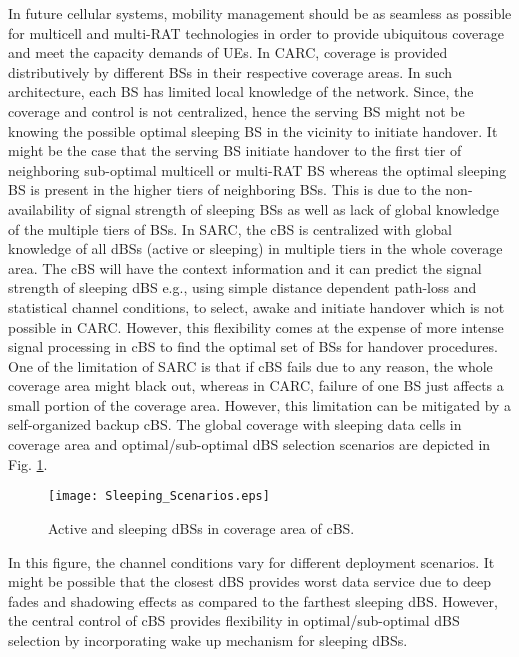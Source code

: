 \documentclass[article,10pt,twocolumn]{IEEEtran}
\begin{document}
In future cellular systems, mobility management should be as seamless as possible for multicell and multi-RAT technologies in order to provide ubiquitous coverage and meet the capacity demands of UEs. In CARC, coverage is provided distributively by different BSs in their respective coverage areas. In such architecture, each BS has limited local knowledge of the network. Since, the coverage and control is not centralized, hence the serving BS might not be knowing the possible optimal sleeping BS in the vicinity to initiate handover. It might be the case that the serving BS initiate handover to the first tier of neighboring sub-optimal multicell or multi-RAT BS whereas the optimal sleeping BS is present in the higher tiers of neighboring BSs. This is due to the non-availability of signal strength of sleeping BSs as well as lack of global knowledge of the multiple tiers of BSs. In SARC, the cBS is centralized with global knowledge of all dBSs (active or sleeping) in multiple tiers in the whole coverage area. The cBS will have the context information and it can predict the signal strength of sleeping dBS e.g., using simple distance dependent path-loss and statistical channel conditions, to select, awake and initiate handover which is not possible in CARC. However, this flexibility comes at the expense of more intense signal processing in cBS to find the optimal set of BSs for handover procedures. One of the limitation of SARC is that if cBS fails due to any reason, the whole coverage area might black out, whereas in CARC, failure of one BS just affects a small portion of the coverage area. However, this limitation can be mitigated by a self-organized backup cBS. The global coverage with sleeping data cells in coverage area and optimal/sub-optimal dBS selection scenarios are depicted in Fig. \ref{Figure:ss}.
\begin{figure}[!htb]
\centering
  \texttt{[image: Sleeping\_Scenarios.eps]}
  \caption{Active and sleeping dBSs in coverage area of cBS.}\label{Figure:ss}
\end{figure}

In this figure, the channel conditions vary for different deployment scenarios. It might be possible that the closest dBS provides worst data service due to deep fades and shadowing effects as compared to the farthest sleeping dBS. However, the central control of cBS provides flexibility in optimal/sub-optimal dBS selection by incorporating wake up mechanism for sleeping dBSs.
\end{document}

